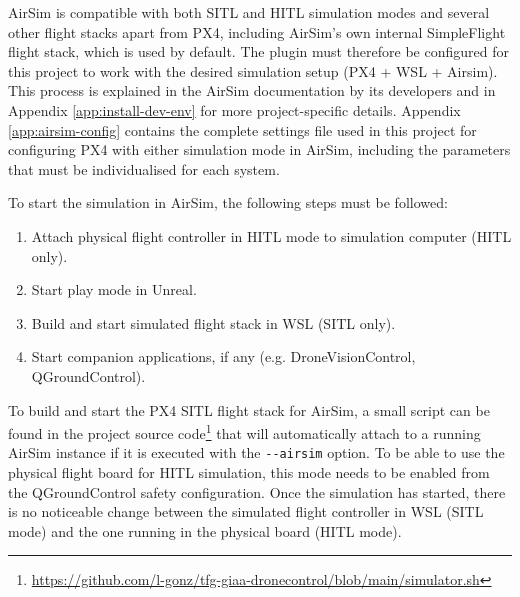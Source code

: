 AirSim is compatible with both SITL and HITL simulation modes and several other flight stacks apart from PX4, including AirSim’s own internal SimpleFlight flight stack, which is used by default. 
The plugin must therefore be configured for this project to work with the desired simulation setup (PX4 + WSL + Airsim).
This process is explained in the AirSim documentation \cite{build-airsim} by its developers and in Appendix \ref{app:install-dev-env} for more project-specific details.
Appendix \ref{app:airsim-config} contains the complete settings file used in this project for configuring PX4 with either simulation mode in AirSim, including the parameters that must be individualised for each system.


To start the simulation in AirSim, the following steps must be followed:
\begin{enumerate}
 \item Attach physical flight controller in HITL mode to simulation computer (HITL only).
 \item Start play mode in Unreal.
 \item Build and start simulated flight stack in WSL (SITL only).
 \item Start companion applications, if any (e.g. DroneVisionControl, QGroundControl).
\end{enumerate}

To build and start the PX4 SITL flight stack for AirSim, a small script can be found in the project source code\footnote{\url{https://github.com/l-gonz/tfg-giaa-dronecontrol/blob/main/simulator.sh}} that will automatically attach to a running AirSim instance if it is executed with the \texttt{-{}-airsim} option.
To be able to use the physical flight board for HITL simulation, this mode needs to be enabled from the QGroundControl safety configuration.
Once the simulation has started, there is no noticeable change between the simulated flight controller in WSL (SITL mode) and the one running in the physical board (HITL mode).
